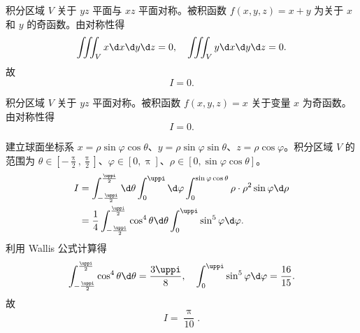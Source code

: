 \begin{solution}
    积分区域 $V$ 关于 $yz$ 平面与 $xz$ 平面对称。被积函数 $f(x, y, z) = x + y$ 为关于 $x$ 和 $y$ 的奇函数。由对称性得
    \begin{equation}
        \iiint_{V} x \d x \d y \d z = 0, \quad \iiint_{V} y \d x \d y \d z = 0.
    \end{equation}
    故
    \begin{equation}
        \boxed{I = 0}.
    \end{equation}

    积分区域 $V$ 关于 $yz$ 平面对称。被积函数 $f(x, y, z) = x$ 关于变量 $x$ 为奇函数。由对称性得
    \begin{equation}
        \boxed{I = 0}.
    \end{equation}

    建立球面坐标系 $x = \rho \sin \varphi \cos \theta$、$y = \rho \sin \varphi \sin \theta$、$z = \rho \cos \varphi$。积分区域 $V$ 的范围为 $\theta \in [-\frac{\uppi}{2}, \frac{\uppi}{2}]$、$\varphi \in [0, \uppi]$、$\rho \in [0, \sin \varphi \cos \theta]$。
    \begin{equation}
        \begin{aligned}
            I & = \int_{-\frac{\uppi}{2}}^{\frac{\uppi}{2}} \d \theta \int_{0}^{\uppi} \d \varphi \int_{0}^{\sin \varphi \cos \theta} \rho \cdot \rho^{2} \sin \varphi \d \rho \\
              & = \frac{1}{4} \int_{-\frac{\uppi}{2}}^{\frac{\uppi}{2}} \cos^{4} \theta \d \theta \int_{0}^{\uppi} \sin^{5} \varphi \d \varphi.
        \end{aligned}
    \end{equation}
    利用 Wallis 公式计算得
    \begin{equation}
        \int_{-\frac{\uppi}{2}}^{\frac{\uppi}{2}} \cos^{4} \theta \d \theta = \frac{3\uppi}{8}, \quad \int_{0}^{\uppi} \sin^{5} \varphi \d \varphi = \frac{16}{15}.
    \end{equation}
    故
    \begin{equation}
        \boxed{I = \frac{\uppi}{10}}.
    \end{equation}


\end{solution}
